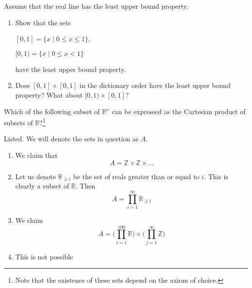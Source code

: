   \begin{exercise}[Munkres 3.15]
    Assume that the real line has the least upper bound property.
    \begin{enumerate}
      \item Show that the sets

      $[0, 1] = \{x \mid 0 \leq x \leq 1\}$,

      $[0, 1) = \{x \mid 0 \leq x < 1\}$

      have the least upper bound property.
      \item Does $[0, 1] \times [0, 1]$ in the dictionary order have the least upper bound property? What about $[0, 1) \times [0, 1]$?
    \end{enumerate}
  \end{exercise}
  \begin{solution}
    
  \end{solution}
  
  \begin{exercise} 
    Which of the following subset of $\mathbb{R}^\omega$ can be expressed as the Cartesian product of subsets of $\mathbb{R}$?\footnote{Note that the existence of these sets depend on the axiom of choice.}
  \end{exercise}
  \begin{solution}
    Listed. We will denote the sets in question as $A$. 
    \begin{enumerate}
      \item We claim that 
        \begin{equation}
          A = \mathbb{Z} \times \mathbb{Z} \times \ldots
        \end{equation}
      \item Let us denote $\mathbb{R}_{\geq i}$ be the set of reals greater than or equal to $i$. This is clearly a subset of $\mathbb{R}$. Then 
        \begin{equation}
          A = \prod_{i=1}^\infty \mathbb{R}_{\geq i}
        \end{equation}
      \item We claim 
        \begin{equation}
          A = \bigg( \prod_{i=1}^{100} \mathbb{R} \bigg) \times \bigg( \prod_{j=1}^\infty \mathbb{Z} \bigg)
        \end{equation}
      \item This is not possible
    \end{enumerate}
  \end{solution}

